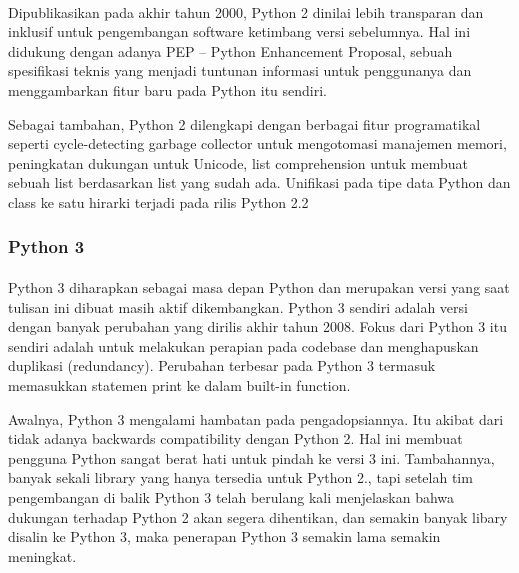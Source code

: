 \documentclass{article}
\begin{document}
\paragraph{}
Dipublikasikan pada akhir tahun 2000, Python 2 dinilai lebih transparan dan inklusif untuk pengembangan software ketimbang versi sebelumnya. Hal ini didukung dengan adanya PEP – Python Enhancement Proposal, sebuah spesifikasi teknis yang menjadi tuntunan informasi untuk penggunanya dan menggambarkan fitur baru pada Python itu sendiri.

Sebagai tambahan, Python 2 dilengkapi dengan berbagai fitur programatikal seperti cycle-detecting garbage collector untuk mengotomasi manajemen memori, peningkatan dukungan untuk Unicode, list comprehension untuk membuat sebuah list berdasarkan list yang sudah ada. Unifikasi pada tipe data Python dan class ke satu hirarki terjadi pada rilis Python 2.2
\subsubsection{Python 3}
\paragraph{}
Python 3 diharapkan sebagai masa depan Python dan merupakan versi yang saat tulisan ini dibuat masih aktif dikembangkan. Python 3 sendiri adalah versi dengan banyak perubahan yang dirilis akhir tahun 2008. Fokus dari Python 3 itu sendiri adalah untuk melakukan perapian pada codebase dan menghapuskan duplikasi (redundancy). Perubahan terbesar pada Python 3 termasuk memasukkan statemen print ke dalam built-in function.

Awalnya, Python 3 mengalami hambatan pada pengadopsiannya. Itu akibat dari tidak adanya backwards compatibility dengan Python 2. Hal ini membuat pengguna Python sangat berat hati untuk pindah ke versi 3 ini. Tambahannya, banyak sekali library yang hanya tersedia untuk Python 2., tapi setelah tim pengembangan di balik Python 3 telah berulang kali menjelaskan bahwa dukungan terhadap Python 2 akan segera dihentikan, dan semakin banyak libary disalin ke Python 3, maka penerapan Python 3 semakin lama semakin meningkat.
\end{document}
